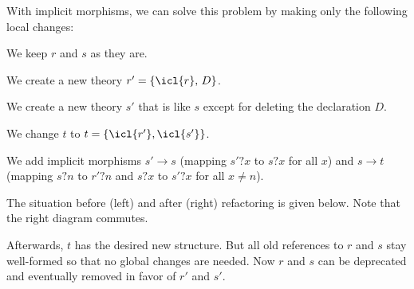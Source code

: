 With implicit morphisms, we can solve this problem by making only the following local changes:
\begin{compactenum}
  \item We keep $r$ and $s$ as they are.
  \item We create a new theory $r'=\{\icl{r},\,D\}$.
  \item We create a new theory $s'$ that is like $s$ except for deleting the declaration $D$.
  \item We change $t$ to $t=\{\icl{r'},\icl{s'}\}$.
  \item We add implicit morphisms $s'\to s$ (mapping $s'?x$ to $s?x$ for all $x$) and $s\to t$ (mapping $s?n$ to $r'?n$ and $s?x$ to $s'?x$ for all $x\neq n$).
\end{compactenum}
The situation before (left) and after (right) refactoring is given below.
Note that the right diagram commutes.
\begin{center}
\tb
{}
\end{center}
Afterwards, $t$ has the desired new structure.
But all old references to $r$ and $s$ stay well-formed so that no global changes are needed.
Now $r$ and $s$ can be deprecated and eventually removed in favor of $r'$ and $s'$.
